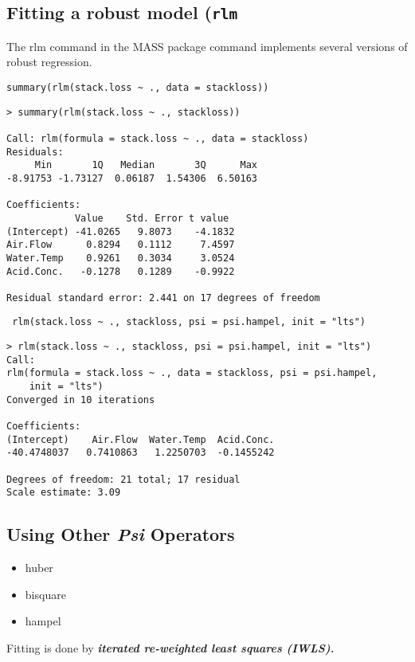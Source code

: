\documentclass[residuals.tex]{subfiles}
\begin{document}
\subsection{Fitting a robust model (\texttt{rlm}}
The rlm command in the MASS package command implements several versions of robust regression. 
\begin{framed}
\begin{verbatim}
summary(rlm(stack.loss ~ ., data = stackloss))
\end{verbatim}
\end{framed}
\begin{verbatim}
> summary(rlm(stack.loss ~ ., stackloss))

Call: rlm(formula = stack.loss ~ ., data = stackloss)
Residuals:
     Min       1Q   Median       3Q      Max 
-8.91753 -1.73127  0.06187  1.54306  6.50163 

Coefficients:
            Value    Std. Error t value 
(Intercept) -41.0265   9.8073    -4.1832
Air.Flow      0.8294   0.1112     7.4597
Water.Temp    0.9261   0.3034     3.0524
Acid.Conc.   -0.1278   0.1289    -0.9922

Residual standard error: 2.441 on 17 degrees of freedom
\end{verbatim}
\newpage
\begin{framed}
\begin{verbatim}
 rlm(stack.loss ~ ., stackloss, psi = psi.hampel, init = "lts")
\end{verbatim}
\end{framed}
\begin{verbatim}
> rlm(stack.loss ~ ., stackloss, psi = psi.hampel, init = "lts")
Call:
rlm(formula = stack.loss ~ ., data = stackloss, psi = psi.hampel, 
    init = "lts")
Converged in 10 iterations

Coefficients:
(Intercept)    Air.Flow  Water.Temp  Acid.Conc. 
-40.4748037   0.7410863   1.2250703  -0.1455242 

Degrees of freedom: 21 total; 17 residual
Scale estimate: 3.09 
\end{verbatim}
\newpage
\subsection{Using Other \textit{Psi} Operators}

\begin{itemize}
\item huber
\item bisquare
\item hampel
\end{itemize}
Fitting is done by \textbf{\emph{iterated re-weighted least squares (IWLS).}}
\end{document}
